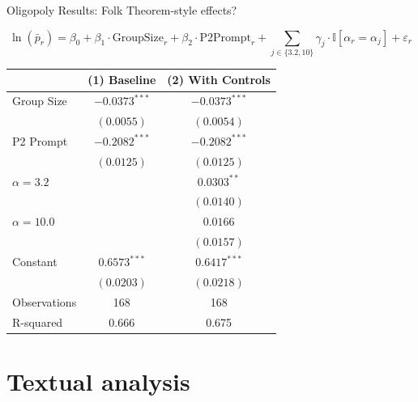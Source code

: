 \documentclass[10pt, aspectratio=169]{beamer}
\begin{document}
\begin{frame}{Oligopoly Results: Folk Theorem-style effects?}

\scriptsize %
\begin{tcolorbox}[colback=myorange!10, colframe=myorange, width=\textwidth]
$$
\ln(\bar{p}_r) = \beta_0 + \beta_1 \cdot \text{GroupSize}_r + \beta_2 \cdot \text{P2Prompt}_r + 
\sum_{j \in \{3.2, 10\}} \gamma_j \cdot \mathbb{I}[\alpha_r = \alpha_j] + \varepsilon_r
$$
\end{tcolorbox}

\vspace{-1em}

\centering
\begin{threeparttable}
\caption{Run-Level Regression: Group Size and Prompt Effects on Log Price}
\begin{tabular}{lcc}
\toprule
& (1) Baseline & (2) With Controls \\
\midrule
Group Size & $-0.0373^{***}$ & $-0.0373^{***}$ \\
          & $(0.0055)$       & $(0.0054)$       \\
P2 Prompt & $-0.2082^{***}$  & $-0.2082^{***}$  \\
          & $(0.0125)$       & $(0.0125)$       \\
$\alpha = 3.2$ &             & $0.0303^{**}$    \\
              &             & $(0.0140)$       \\
$\alpha = 10.0$&             & $0.0166$         \\
              &             & $(0.0157)$       \\
Constant      & $0.6573^{***}$ & $0.6417^{***}$ \\
              & $(0.0203)$     & $(0.0218)$     \\
\midrule
Observations  & 168           & 168             \\
R-squared     & 0.666         & 0.675           \\
\bottomrule
\end{tabular}
\end{threeparttable}

\end{frame}

\section{Textual analysis}
\end{document}
